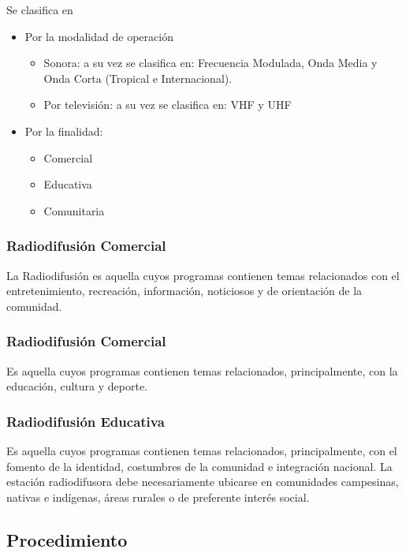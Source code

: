 \documentclass[11pt]{article}
\begin{document}
Se clasifica en 

\begin{itemize}
	\item Por la modalidad de operación
	\begin{itemize}
		\item Sonora: a su vez se clasifica en: 
		Frecuencia Modulada, Onda Media y 
		Onda Corta (Tropical e Internacional).
		\item Por televisión: a  su  vez  se  clasifica  en: 
		VHF y UHF
	\end{itemize}
	\item Por la finalidad:
	\begin{itemize}
		\item Comercial
		\item Educativa
		\item Comunitaria
	\end{itemize}
\end{itemize}

\subsubsection{Radiodifusión Comercial}
La Radiodifusión es aquella cuyos programas contienen temas 
relacionados  con  el  entretenimiento,  recreación, 
información,  noticiosos  y  de  orientación  de  la 
comunidad.

\subsubsection{Radiodifusión Comercial}
Es aquella cuyos programas contienen temas 
relacionados,  principalmente,  con  la  educación, 
cultura y deporte. 

\subsubsection{Radiodifusión Educativa}

Es aquella cuyos programas contienen temas 
relacionados, principalmente, con el fomento de 
la identidad, costumbres de la comunidad e 
integración nacional. La estación radiodifusora  debe necesariamente 
ubicarse  en  comunidades  campesinas,  nativas  e 
indígenas,  áreas  rurales  o  de  preferente  interés 
social. 

\subsection{Procedimiento}
\end{document}
